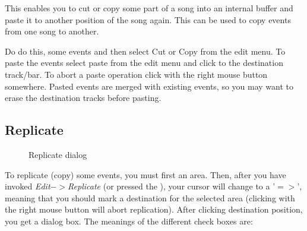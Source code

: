 \documentclass[letterpaper]{report}
\begin{document}
This enables you to cut or copy some part of a song into an internal buffer
and paste it to another position of the song again. This can be used to
copy events from one song to another.

Do do this,  some events and then select Cut or
Copy from the edit menu. To paste the events select paste from the edit menu
and click to the destination track/bar. To abort a paste operation click with
the right mouse button somewhere. Pasted events are merged with existing
events, so you may want to erase the destination tracks before pasting.



\subsection{Replicate}\label{replicate}

\begin{figure}
\caption{Replicate dialog}
\end{figure}

To replicate (copy) some events, you must first 
an area. Then, after you have invoked {\em Edit$->$Replicate} (or
pressed the ), your cursor will change to
a '$=>$', meaning that you should mark a
destination for the selected area (clicking with the right mouse button will
abort replication). After clicking destination position, you get a dialog
box. The meanings of the different check boxes are:
\end{document}
